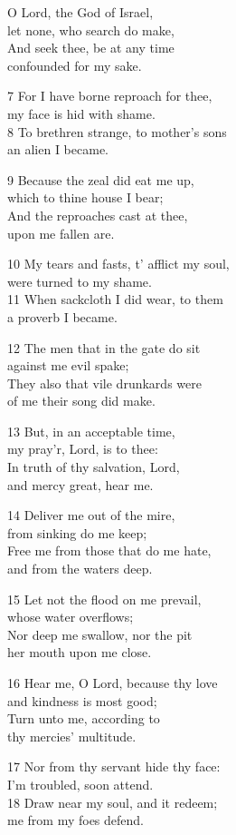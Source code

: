 O Lord, the God of Israel,\\
let none, who search do make,\\
And seek thee, be at any time\\
confounded for my sake.

7 For I have borne reproach for thee,\\
my face is hid with shame.\\
8 To brethren strange, to mother’s sons\\
an alien I became.

9 Because the zeal did eat me up,\\
which to thine house I bear;\\
And the reproaches cast at thee,\\
upon me fallen are.

10 My tears and fasts, t’ afflict my soul,\\
were turned to my shame.\\
11 When sackcloth I did wear, to them\\
a proverb I became.

12 The men that in the gate do sit\\
against me evil spake;\\
They also that vile drunkards were\\
of me their song did make.

13 But, in an acceptable time,\\
my pray’r, Lord, is to thee:\\
In truth of thy salvation, Lord,\\
and mercy great, hear me.

14 Deliver me out of the mire,\\
from sinking do me keep;\\
Free me from those that do me hate,\\
and from the waters deep.

15 Let not the flood on me prevail,\\
whose water overflows;\\
Nor deep me swallow, nor the pit\\
her mouth upon me close.

16 Hear me, O Lord, because thy love\\
and kindness is most good;\\
Turn unto me, according to\\
thy mercies’ multitude.

17 Nor from thy servant hide thy face:\\
I’m troubled, soon attend.\\
18 Draw near my soul, and it redeem;\\
me from my foes defend.

